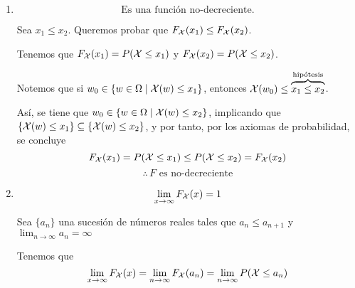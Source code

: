 \begin{enumerate}
  \item $$\text{Es una función no-decreciente.}$$
    \begin{myproof}
      Sea $x_1 \le x_2$. Queremos probar que $F_{\mathcal{X}}(x_1) \le F_{\mathcal{X}}(x_2)$.

      Tenemos que $F_{\mathcal{X}}(x_1) = P(\mathcal{X} \le x_1)$ y $F_{\mathcal{X}}(x_2) = P(\mathcal{X} \le x_2)$.

      Notemos que si $w_0 \in \{w \in \Omega \mid \mathcal{X}(w) \le x_1\}$, entonces $\mathcal{X}(w_0) \le \overbrace{x_1 \le x_2}^{\text{hipótesis}}$.

    Así, se tiene que $w_0 \in \{w \in \Omega \mid \mathcal{X}(w) \le x_2\}$, implicando que $\{\mathcal{X}(w) \le x_1\} \subseteq \{\mathcal{X}(w) \le x_2\}$, y por tanto, por los axiomas de probabilidad, se concluye
      \[F_{\mathcal{X}}(x_1) = P(\mathcal{X} \le x_1) \le P(\mathcal{X} \le x_2) = F_{\mathcal{X}}(x_2)\]
      \[\therefore \, \text{$F$ es no-decreciente}\]

    \end{myproof}
  \item \[ \lim_{x \to \infty} F_{\mathcal{X}}(x) = 1 \]
    \begin{myproof}
      Sea $\{a_n\}$ una sucesión de números reales tales que $a_n \le a_{n+1}$ y $\lim_{n\to \infty} a_n = \infty$

      Tenemos que
      \[\lim_{x \to \infty} F_{\mathcal{X}}(x) = \lim_{n \to \infty} F_{\mathcal{X}}(a_n) = \lim_{n \to \infty} P(\mathcal{X} \le a_n)\]


\end{myproof}
\end{enumerate}
